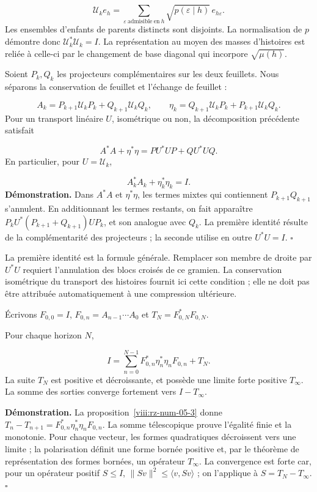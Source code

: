\[
\mathcal U_ke_h=
\sum_{\varepsilon\ \mathrm{admisible\ en}\ h}
\sqrt{p(\varepsilon\mid h)}\,e_{h\varepsilon}.
\]
Les ensembles d’enfants de parents distincts sont disjoints. La normalisation de \(p\) démontre donc \(\mathcal U_k^*\mathcal U_k=I\). La représentation au moyen des masses d’histoires est reliée à celle-ci par le changement de base diagonal qui incorpore \(\sqrt{\mu(h)}\).

Soient \(P_k,Q_k\) les projecteurs complémentaires sur les deux feuillets. Nous séparons la conservation de feuillet et l'échange de feuillet :

\[
A_k=P_{k+1}\mathcal U_kP_k+Q_{k+1}\mathcal U_kQ_k,
\qquad
\eta_k=Q_{k+1}\mathcal U_kP_k+P_{k+1}\mathcal U_kQ_k.
\]
Pour un transport linéaire \(U\), isométrique ou non, la décomposition précédente satisfait

\[
A^*A+\eta^*\eta=PU^*UP+QU^*UQ.
\]
En particulier, pour \(U=\mathcal U_k\),

\[
A_k^*A_k+\eta_k^*\eta_k=I.
\]
\textbf{Démonstration.} Dans \(A^*A\) et \(\eta^*\eta\), les termes mixtes qui contiennent \(P_{k+1}Q_{k+1}\) s’annulent. En additionnant les termes restants, on fait apparaître \(P_kU^*(P_{k+1}+Q_{k+1})UP_k\), et son analogue avec \(Q_k\). La première identité résulte de la complémentarité des projecteurs ; la seconde utilise en outre \(U^*U=I\). \hfill\(\square\)

La première identité est la formule générale. Remplacer son membre de droite par \(U^*U\) requiert l'annulation des blocs croisés de ce gramien. La conservation isométrique du transport des histoires fournit ici cette condition ; elle ne doit pas être attribuée automatiquement à une compression ultérieure.

Écrivons \(F_{0,0}=I\), \(F_{0,n}=A_{n-1}\cdots A_0\) et \(T_N=F_{0,N}^*F_{0,N}\).

Pour chaque horizon \(N\),

\[
I=\sum_{n=0}^{N-1}
F_{0,n}^*\eta_n^*\eta_nF_{0,n}+T_N.
\]
La suite \(T_N\) est positive et décroissante, et possède une limite forte positive \(T_\infty\). La somme des sorties converge fortement vers \(I-T_\infty\).

\textbf{Démonstration.} La proposition~\ref{viii:rz-num-05-3} donne \(T_n-T_{n+1}=F_{0,n}^*\eta_n^*\eta_nF_{0,n}\). La somme télescopique prouve l’égalité finie et la monotonie. Pour chaque vecteur, les formes quadratiques décroissent vers une limite ; la polarisation définit une forme bornée positive et, par le théorème de représentation des formes bornées, un opérateur \(T_\infty\). La convergence est forte car, pour un opérateur positif \(S\leq I\), \(\|Sv\|^2\leq\langle v,Sv\rangle\) ; on l’applique à \(S=T_N-T_\infty\). \hfill\(\square\)

